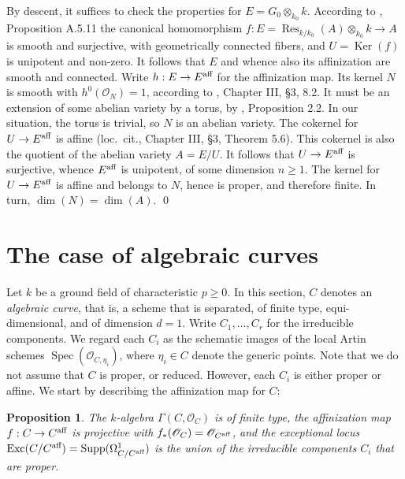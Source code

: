 \documentclass[oneside, 12pt]{amsart}
\newcommand\mylabel[1]{\label{#1}\marginpar{\vspace{-1ex}\medskip\medskip\footnotesize \tt #1}}
\renewcommand\mylabel[1]{\label{#1}}
\newtheorem{proposition}[theorem]{Proposition}
\theoremstyle{definition}
\theoremstyle{remark}
\newcommand{\aff}{\text{\rm aff}}
\newcommand{\Exc}{\operatorname{Exc}}
\newcommand{\Kernel}{\operatorname{Ker}}
\renewcommand{\O}{\mathscr{O}}
\newcommand{\ra}{\rightarrow}
\newcommand{\Res}{\operatorname{Res}}
\newcommand{\Spec}{\operatorname{Spec}}
\newcommand{\Supp}{\operatorname{Supp}}
\begin{document}
\proof
By descent, it suffices to check the properties for  $E= G_0\otimes_{k_0}k$.
According to \cite{Conrad; Gabber; Prasad 2010}, Proposition A.5.11 the  canonical homomorphism $f:E=\Res_{k/k_0}(A)\otimes_{k_0}k\ra A$ is smooth  and surjective, with
geometrically connected fibers, and $U=\Kernel(f)$ is unipotent and non-zero.
It follows that  $E$ and whence also its affinization are smooth and connected. 
Write $h:E\ra E^\aff$ for the affinization map. Its kernel $N$ is smooth with $h^0(\O_N)=1$, according to \cite{Demazure; Gabriel 1970}, Chapter III, \S3, 8.2.
It must be an extension of some abelian variety by a torus,
by \cite{Brion 2009}, Proposition 2.2. In our situation, the torus is trivial, so $N$ is an abelian variety.
The cokernel for $U\ra E^\aff$ is affine (loc.\ cit., Chapter III, \S3, Theorem 5.6). This cokernel is also the quotient of the abelian variety $A=E/U$.
It follows that $U\ra E^\aff$ is surjective, whence $E^\aff$ is unipotent, of some dimension $n\geq 1$.
The kernel for $U\ra E^\aff$ is affine and belongs to $N$, hence is proper, and therefore finite. In turn, $\dim(N)=\dim(A)$.
\qed


\section{The case of algebraic curves}
\mylabel{Algebraic curves}

Let $k$ be a ground field of characteristic $p\geq 0$. In this section,
$C$ denotes an \emph{algebraic curve}, that is, a scheme that is separated, of finite type,
equi-dimensional, and of dimension $d=1$.  
Write $C_1,\ldots,C_r$ for the irreducible components.   We regard each $C_i$
as the schematic images of the local Artin schemes $\Spec(\O_{C,\eta_i})$,
where  $\eta_i\in C$ denote the generic points.
Note that we do not assume that $C$ is proper, or reduced. However,   each $C_i$ is either proper or affine. 
We start by describing the affinization map for $C$:

\begin{proposition}
\mylabel{affinization curve}
The $k$-algebra $\Gamma(C,\O_C)$ is of finite type, the 
affinization map $f:C\ra C^\aff$ is projective with $f_*(\O_C)=\O_{C^\aff}$, and the exceptional locus
$\Exc(C/C^\aff)=\Supp(\Omega^1_{C/C^\aff})$ is the union of the irreducible components $C_i$ that are proper.
\end{proposition}
\end{document}

